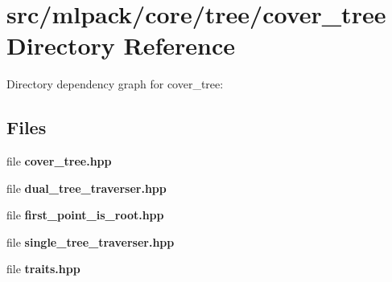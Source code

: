 \section{src/mlpack/core/tree/cover\-\_\-tree Directory Reference}
\label{dir_99c4623ed086f7710d9e7ec0a5a6a00c}
Directory dependency graph for cover\-\_\-tree\-:
\subsection*{Files}
\begin{DoxyCompactItemize}
\item 
file {\bf cover\-\_\-tree.\-hpp}
\item 
file {\bf dual\-\_\-tree\-\_\-traverser.\-hpp}
\item 
file {\bf first\-\_\-point\-\_\-is\-\_\-root.\-hpp}
\item 
file {\bf single\-\_\-tree\-\_\-traverser.\-hpp}
\item 
file {\bf traits.\-hpp}
\end{DoxyCompactItemize}
